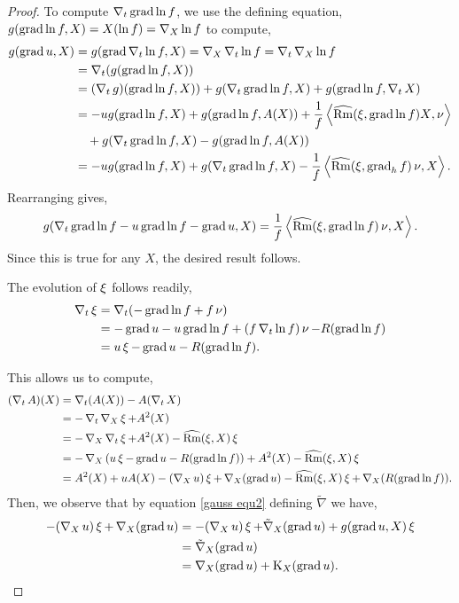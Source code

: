 \documentclass{amsart}
\begin{document}
\begin{proof}
To compute $\D_t \grad \ln f$, we use the defining equation, $g(\grad \ln f, X) = X(\ln f) = \D_X \ln f$ to compute,
\[
\begin{split}
g(\grad u, X) &= g(\grad \D_t \ln f, X) = \D_X \D_t \ln f = \D_t \D_X \ln f \\
&=  \D_t (g(\grad \ln f, X)) \\
&= (\D_t g) (\grad \ln f, X)) + g(\D_t \grad \ln f, X) + g(\grad \ln f, \D_t X) \\
&= -ug(\grad\ln f, X) + g(\grad \ln f, A(X)) + \frac{1}{f}\ip{\widehat{\Rm}(\vel, \grad \ln f)X}{\nor} \\
&\quad  + g(\D_t \grad \ln f, X) - g(\grad \ln f, A(X)) \\
&= - u g(\grad \ln f, X) + g(\D_t \grad \ln f, X) - \frac{1}{f} \ip{\widehat{\Rm}(\vel, \grad_h f)\nor}{X}.
\end{split}
\]
Rearranging gives,
\[
g(\D_t \grad \ln f - u \grad\ln f - \grad u, X) = \frac{1}{f} \ip{\widehat{\Rm}(\vel, \grad \ln f) \nor}{X}.
\]
Since this is true for any $X$, the desired result follows.

The evolution of $\vel$ follows readily,
\[
\begin{split}
\D_t \vel &= \D_t (-\grad \ln f + f \nor) \\
& = -\grad u - u \grad \ln f + (f \D_t \ln f) \nor - R(\grad \ln f) \\
&= u\vel - \grad u - R(\grad \ln f).
\end{split}
\]

This allows us to compute,
\[
\begin{split}
(\D_t A)(X) &= \D_t (A(X)) - A(\D_t X) \\
&= - \D_t \D_X \vel + A^2(X) \\
&= -\D_X \D_t \vel + A^2(X) - \widehat{\Rm} (\vel, X) \vel \\
&= -\D_X \left(u\vel - \grad u - R(\grad \ln f)\right) + A^2(X) - \widehat{\Rm} (\vel, X) \vel \\
&= A^2(X) + u A(X) -(\D_X u)\vel + \D_X (\grad u) - \widehat{\Rm} (\vel, X) \vel + \D_X (R(\grad \ln f)).
\end{split}
\]
Then, we observe that by equation \eqref{gauss equ2} defining $\tilde{\nabla}$ we have,
\[
\begin{split}
-(\D_X u)\vel + \D_X (\grad u) &= -(\D_X u)\vel + \tilde{\nabla}_X (\grad u) + g(\grad u, X) \vel \\
&= \tilde{\nabla}_X (\grad u) \\
&= \nabla_X (\grad u) + \diff_X (\grad u).
\end{split}
\]


\end{proof}
\end{document}
